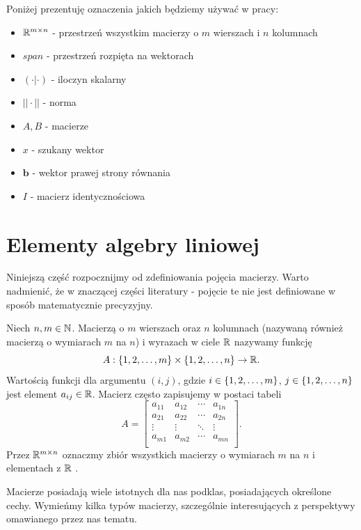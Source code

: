 \documentclass[12pt,a4paper]{report}
\newcommand{\vr}[1]{\mathbf{#1}}
\newcommand{\mx}[1]{{#1}}
\begin{document}
Poniżej prezentuję oznaczenia jakich będziemy używać w pracy: 
\begin{itemize}
\item$\mathbb{R}^{m \times n}$ - przestrzeń wszystkim macierzy o $m$ wierszach i $n$ kolumnach
\item$span$ - przestrzeń rozpięta na wektorach
\item$(\cdot |\cdot )$ - iloczyn skalarny
\item$||\cdot || $ - norma
\item$\mx{A}, \mx{B}$ - macierze
\item$x$ - szukany wektor
\item$\vr{b}$ - wektor prawej strony równania
\item$\mx{I}$ - macierz identycznościowa

\end{itemize}

\section{Elementy algebry liniowej} 

Niniejszą część rozpocznijmy od zdefiniowania pojęcia macierzy. Warto nadmienić, że w znaczącej części literatury - pojęcie te nie jest definiowane w sposób matematycznie precyzyjny.

\begin{definition}
Niech $n,m \in \mathbb{N}$. Macierzą o $m$ wierszach oraz $n$ kolumnach (nazywaną również macierzą o wymiarach $m$ na $n$) i wyrazach w ciele $\mathbb{R}$ nazywamy funkcję 
$$
\mx{A}: \set{1,2, \ldots ,m}\times \set{1,2, \ldots ,n} \to \setR.
$$
Wartością funkcji dla argumentu $(i,j)$, gdzie $i \in \left\lbrace {1,2, \ldots ,m} \right\rbrace$, $j \in \left\lbrace {1,2, \ldots ,n} \right\rbrace$ jest element $a_{ij} \in \mathbb{R}$. Macierz często zapisujemy w postaci tabeli
$$
\mx{A} = \begin{bmatrix}
 a_{11} & a_{12} & \cdots & a_{1n} \\
         a_{21} & a_{22} & \cdots & a_{2n} \\
         \vdots & \vdots & \ddots & \vdots \\
         a_{m1} & a_{m2} & \cdots & a_{mn} \\
\end{bmatrix}.
$$
Przez $\mathbb{R}^{m \times n}$ oznaczmy zbiór wszystkich macierzy o wymiarach $m$ na $n$ i elementach z $\mathbb{R}$ .
\end{definition}

Macierze posiadają wiele istotnych dla nas podklas, posiadających określone cechy. Wymieńmy kilka typów macierzy, szczególnie interesujących z perspektywy omawianego przez nas tematu.
\end{document}
